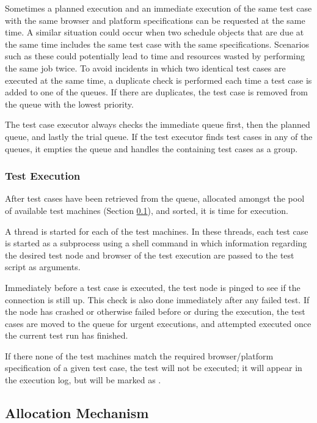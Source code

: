 Sometimes a planned execution and an immediate execution of the same test case with the same browser and platform specifications can be requested at the same time. A similar situation could occur when two schedule objects that are due at the same time includes the same test case with the same specifications. Scenarios such as these could potentially lead to time and resources wasted by performing the same job twice. To avoid incidents in which two identical test cases are executed at the same time, a duplicate check is performed each time a test case is added to one of the queues. If there are duplicates, the test case is removed from the queue with the lowest priority.

The test case executor always checks the immediate queue first, then the planned queue, and lastly the trial queue. If the test executor finds test cases in any of the queues, it empties the queue and handles the containing test cases as a group.

\subsubsection{Test Execution}

After test cases have been retrieved from the queue, allocated amongst the pool of available test machines (Section \ref{allocation}), and sorted, it is time for execution.

A thread is started for each of the test machines. In these threads, each test case is started as a subprocess using a shell command in which information regarding the desired test node and browser of the test execution are passed to the test script as arguments.

Immediately before a test case is executed, the test node is pinged to see if the connection is still up. This check is also done immediately after any failed test. If the node has crashed or otherwise failed before or during the execution, the test cases are moved to the queue for urgent executions, and attempted executed once the current test run has finished.

If there none of the test machines match the required browser/platform specification of a given test case, the test will not be executed; it will appear in the execution log, but will be marked as .




\subsection{Allocation Mechanism}\label{allocation}

